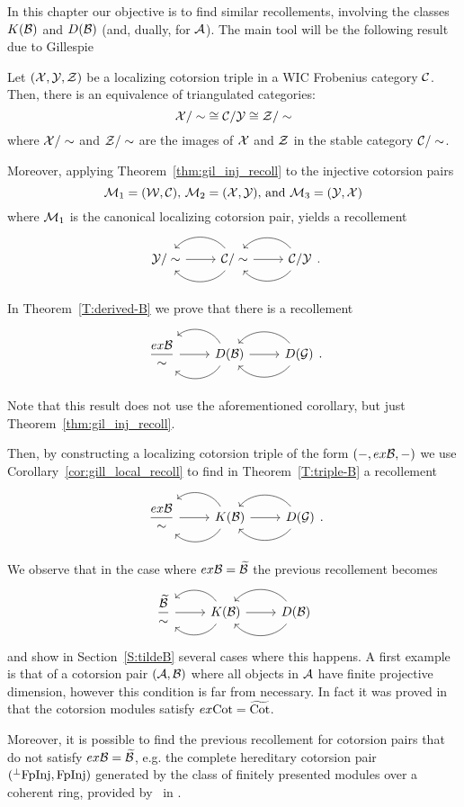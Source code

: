 In this chapter our objective is to find similar recollements, involving the classes $K(\mathcal{B})$ and $D(\mathcal{B})$ (and, dually, for $\mathcal{A}$). The main tool will be the following result due to Gillespie \cite[Corollary~4.5]{G7}

\begin{nonlisting_cor}[\ref{cor:gill_local_recoll}]
  Let $(\mathcal{X},\mathcal{Y},\mathcal{Z})$ be a localizing cotorsion triple in a WIC Frobenius category $\mathcal{C}$. Then, there is an equivalence of triangulated categories:
  \[ {\mathcal{X}/\sim} \cong {\mathcal{C}/\mathcal{Y}}  \cong {\mathcal{Z}/\sim} \]
  where $\mathcal{X}/\sim$ and $\mathcal{Z}/\sim$ are the images of $\mathcal{X}$ and $\mathcal{Z}$ in the stable category $\mathcal{C}/\sim$.

  Moreover, applying Theorem~\ref{thm:gil_inj_recoll} to the injective cotorsion pairs
  \[ \mathcal{M}_1=(\mathcal{W},\mathcal{C})\text{, }\mathcal{M}_2=(\mathcal{X},\mathcal{Y})\text{, and }\mathcal{M}_3=(\mathcal{Y},\mathcal{X}) \]
  where $\mathcal{M}_1$ is the canonical localizing cotorsion pair, yields a recollement
  \begin{equation*}
    \recdiagram{\Y/\sim}{\C/\sim}{\C/\Y}.
  \end{equation*}
\end{nonlisting_cor}

In Theorem~\ref{T:derived-B} we prove that there is a recollement
\begin{equation*}
  \recdiagram{\dfrac{ex\B}{\sim}}{D(\B)}{D(\G)}.
\end{equation*}

Note that this result does not use the aforementioned corollary, but just Theorem~\ref{thm:gil_inj_recoll}.

Then, by constructing a localizing cotorsion triple of the form $(-,ex\mathcal{B},-)$ we use Corollary~\ref{cor:gill_local_recoll} to find in Theorem~\ref{T:triple-B} a recollement
\begin{equation*}
  \recdiagram{\dfrac{ex\B}{\sim}}{K(\B)}{D(\G)}.
\end{equation*}

We observe that in the case where $ex\mathcal{B}=\widetilde{\mathcal{B}}$ the previous recollement becomes
\begin{equation*}
  \recdiagram{\dfrac{\wac{\B}}{\sim}}{K(\B)}{D(\B)}
\end{equation*}
and show in Section~\ref{S:tildeB} several cases where this happens. A first example is that of a cotorsion pair $(\mathcal{A},\mathcal{B})$ where all objects in $\mathcal{A}$ have finite projective dimension, however this condition is far from necessary. In fact it was proved in \cite{BCIE} that the cotorsion modules satisfy $ex\mathrm{Cot}=\widetilde{\mathrm{Cot}}$.

Moreover, it is possible to find the previous recollement for cotorsion pairs that do not satisfy $ex\mathcal{B}=\widetilde{\mathcal{B}}$, e.g. the complete hereditary cotorsion pair $(^\perp\mathrm{FpInj},\mathrm{FpInj})$ generated by the class of finitely presented modules over a coherent ring, provided by \sto\  in \cite{Stopurity}.

